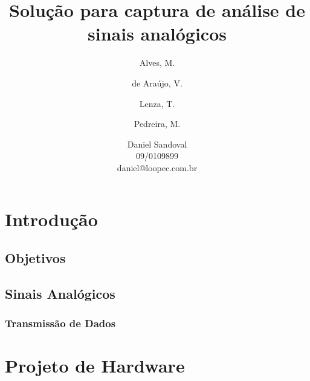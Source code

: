 \documentclass[12pt,a4paper]{report}
\title{Solução para captura de análise de sinais analógicos}
\author{Alves, M.\\
	\and
	de Araújo, V.\\
	\and
	Lenza, T.\\
	\and
	Pedreira, M.\\
	\and
	Daniel Sandoval\\
	09/0109899\\
	daniel@loopec.com.br}
\begin{document}
\maketitle
\tableofcontents

\chapter{Introdução}


\section{Objetivos}


\section{Sinais Analógicos}


\subsection{Transmissão de Dados}


\chapter{Projeto de Hardware}


\end{document}
